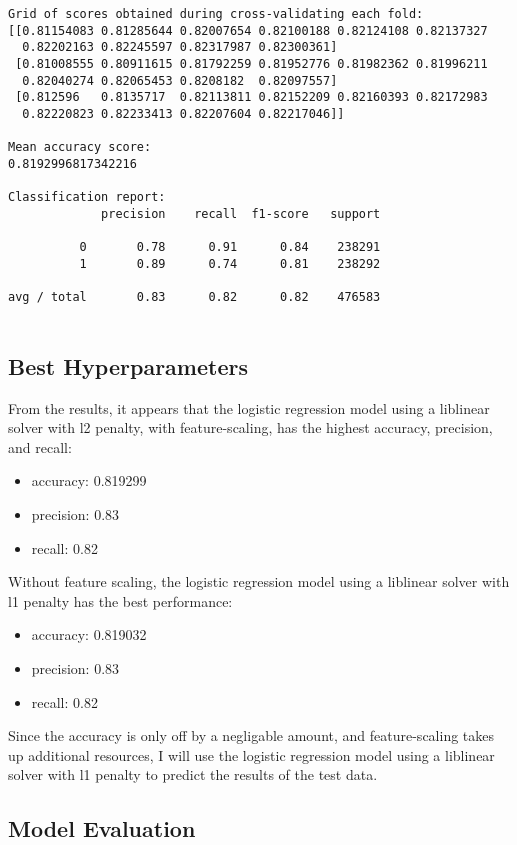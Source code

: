 \documentclass[11pt]{article}
\providecommand{\tightlist}{%
      \setlength{\itemsep}{0pt}\setlength{\parskip}{0pt}}
\begin{document}
\begin{Verbatim}[commandchars=\\\{\},fontsize=\footnotesize]
Grid of scores obtained during cross-validating each fold:
[[0.81154083 0.81285644 0.82007654 0.82100188 0.82124108 0.82137327
  0.82202163 0.82245597 0.82317987 0.82300361]
 [0.81008555 0.80911615 0.81792259 0.81952776 0.81982362 0.81996211
  0.82040274 0.82065453 0.8208182  0.82097557]
 [0.812596   0.8135717  0.82113811 0.82152209 0.82160393 0.82172983
  0.82220823 0.82233413 0.82207604 0.82217046]]

Mean accuracy score:
0.8192996817342216

Classification report:
             precision    recall  f1-score   support

          0       0.78      0.91      0.84    238291
          1       0.89      0.74      0.81    238292

avg / total       0.83      0.82      0.82    476583


    \end{Verbatim}
\newpage
    \subsection{Best Hyperparameters}

From the results, it appears that the logistic regression model using a
liblinear solver with l2 penalty, with feature-scaling, has the highest
accuracy, precision, and recall:

\begin{itemize}
\tightlist
\item
  accuracy: 0.819299
\item
  precision: 0.83
\item
  recall: 0.82
\end{itemize}

Without feature scaling, the logistic regression model using a liblinear
solver with l1 penalty has the best performance:

\begin{itemize}
\tightlist
\item
  accuracy: 0.819032
\item
  precision: 0.83
\item
  recall: 0.82
\end{itemize}

Since the accuracy is only off by a negligable amount, and
feature-scaling takes up additional resources, I will use the logistic
regression model using a liblinear solver with l1 penalty to predict the
results of the test data.

    \subsection{Model Evaluation}
\end{document}
